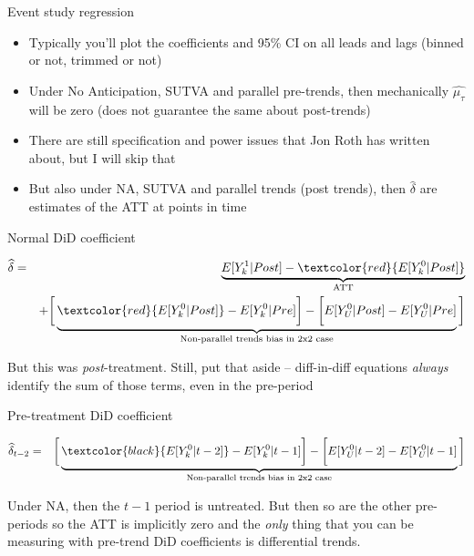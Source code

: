 \documentclass{beamer}
\begin{document}
\begin{frame}{Event study regression}


\begin{itemize}
\item  Typically you'll plot the coefficients and 95\% CI on all leads and lags (binned or not, trimmed or not) 
\item Under No Anticipation, SUTVA and parallel pre-trends, then mechanically $\widehat{\mu_{\tau}}$ will be zero (does not guarantee the same about post-trends)
\item There are still specification and power issues that Jon Roth has written about, but I will skip that
\item But also under NA, SUTVA and parallel trends (post trends), then $\widehat{\delta}$ are estimates of the ATT at points in time
\end{itemize}

\end{frame}

\begin{frame}{Normal DiD coefficient}

\begin{eqnarray*}
\widehat{\delta} &=& \underbrace{E[Y^1_k | Post] - \textcolor{red}{E[Y^0_k | Post]}}_{\mathclap{\text{ATT}}} \\
&& + \bigg [  \underbrace{\textcolor{red}{E[Y^0_k | Post]} - E[Y^0_k | Pre] \bigg ] - \bigg [ E[Y^0_U | Post] - E[Y_U^0 | Pre] }_{\mathclap{\text{Non-parallel trends bias in 2x2 case}}} \bigg ]
\end{eqnarray*}

\bigskip

But this was \emph{post}-treatment.  Still, put that aside -- diff-in-diff equations \emph{always} identify the sum of those terms, even in the pre-period


\end{frame}

\begin{frame}{Pre-treatment DiD coefficient}

\begin{eqnarray*}
\widehat{\delta}_{t-2} &=& \bigg [  \underbrace{\textcolor{black}{E[Y^0_k | t-2]} - E[Y^0_k | t-1] \bigg ] - \bigg [ E[Y^0_U | t-2] - E[Y_U^0 | t-1] }_{\mathclap{\text{Non-parallel trends bias in 2x2 case}}} \bigg ]
\end{eqnarray*}

\bigskip

Under NA, then the $t-1$ period is untreated.  But then so are the other pre-periods so the ATT is implicitly zero and the \emph{only} thing that you can be measuring with pre-trend DiD coefficients is differential trends.  


\end{frame}
\end{document}
